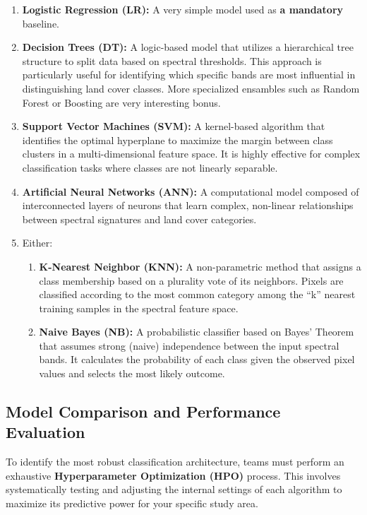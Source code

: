 \documentclass{article}
\begin{document}
\begin{enumerate}
    \item \textbf{Logistic Regression (LR):} A very simple model used as \textbf{a mandatory} baseline.

    \item \textbf{Decision Trees (DT):} A logic-based model that utilizes a hierarchical tree structure to split data based on spectral thresholds. This approach is particularly useful for identifying which specific bands are most influential in distinguishing land cover classes.  More specialized ensambles such as Random Forest or Boosting are very interesting bonus.

    \item \textbf{Support Vector Machines (SVM):} A kernel-based algorithm that identifies the optimal hyperplane to maximize the margin between class clusters in a multi-dimensional feature space. It is highly effective for complex classification tasks where classes are not linearly separable.

    \item \textbf{Artificial Neural Networks (ANN):} A computational model composed of interconnected layers of neurons that learn complex, non-linear relationships between spectral signatures and land cover categories.

    \item Either:

        \begin{enumerate}
            \item \textbf{K-Nearest Neighbor (KNN):} A non-parametric method that assigns a class membership based on a plurality vote of its neighbors. Pixels are classified according to the most common category among the ``k'' nearest training samples in the spectral feature space.

            \item \textbf{Naive Bayes (NB):} A probabilistic classifier based on Bayes' Theorem that assumes strong (naive) independence between the input spectral bands. It calculates the probability of each class given the observed pixel values and selects the most likely outcome.

        \end{enumerate}
\end{enumerate}

\subsection{Model Comparison and Performance Evaluation}
To identify the most robust classification architecture, teams must perform an exhaustive \textbf{Hyperparameter Optimization (HPO)} process. This involves systematically testing and adjusting the internal settings of each algorithm to maximize its predictive power for your specific study area.
\end{document}

